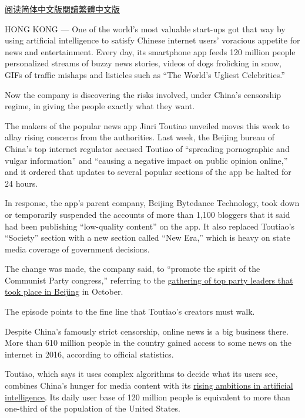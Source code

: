 \href{https://cn.nytimes3xbfgragh.onion/business/20180103/china-toutiao-censorship/}{阅读简体中文版}\href{https://cn.nytimes3xbfgragh.onion/business/20180103/china-toutiao-censorship/zh-hant/}{閱讀繁體中文版}

HONG KONG --- One of the world's most valuable start-ups got that way by
using artificial intelligence to satisfy Chinese internet users'
voracious appetite for news and entertainment. Every day, its smartphone
app feeds 120 million people personalized streams of buzzy news stories,
videos of dogs frolicking in snow, GIFs of traffic mishaps and listicles
such as ``The World's Ugliest Celebrities.''

Now the company is discovering the risks involved, under China's
censorship regime, in giving the people exactly what they want.

The makers of the popular news app Jinri Toutiao unveiled moves this
week to allay rising concerns from the authorities. Last week, the
Beijing bureau of China's top internet regulator accused Toutiao of
``spreading pornographic and vulgar information'' and ``causing a
negative impact on public opinion online,'' and it ordered that updates
to several popular sections of the app be halted for 24 hours.

In response, the app's parent company, Beijing Bytedance Technology,
took down or temporarily suspended the accounts of more than 1,100
bloggers that it said had been publishing ``low-quality content'' on the
app. It also replaced Toutiao's ``Society'' section with a new section
called ``New Era,'' which is heavy on state media coverage of government
decisions.

The change was made, the company said, to ``promote the spirit of the
Communist Party congress,'' referring to the
\href{https://www.nytimes3xbfgragh.onion/2017/10/17/world/asia/xi-jinping-communist-party-china.html}{gathering
of top party leaders that took place in Beijing} in October.

The episode points to the fine line that Toutiao's creators must walk.

Despite China's famously strict censorship, online news is a big
business there. More than 610 million people in the country gained
access to some news on the internet in 2016, according to official
statistics.

Toutiao, which says it uses complex algorithms to decide what its users
see, combines China's hunger for media content with its
\href{https://www.nytimes3xbfgragh.onion/2017/05/27/technology/china-us-ai-artificial-intelligence.html}{rising
ambitions in artificial intelligence}. Its daily user base of 120
million people is equivalent to more than one-third of the population of
the United States.

